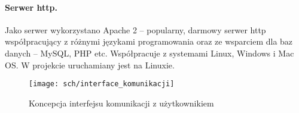 \paragraph{Serwer http.}
Jako serwer wykorzystano Apache 2 – popularny, darmowy serwer http współpracujący z różnymi językami programowania oraz ze wsparciem dla baz danych – MySQL, PHP etc.
Współpracuje z systemami Linux, Windows i Mac OS. W projekcie uruchamiany jest na Linuxie.
 
 
\begin{figure}[bth]
\centering
{\texttt{[image: sch/interface\_komunikacji]}}
\caption[Koncepcja interfejsu komunikacji z użytkownikiem]{Koncepcja interfejsu komunikacji z użytkownikiem}
\label{fig:komunikacja}
\end{figure}







